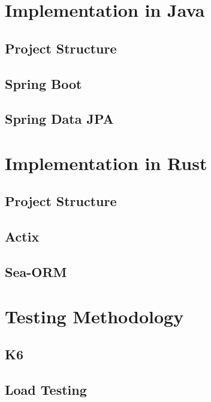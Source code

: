\documentclass[a4paper,12pt]{article}
\begin{document}
	\section{Implementation in Java}
	\label{sec:java_implementation}

	\subsection{Project Structure}
	\label{subsec:project_structure_java}

	\subsection{Spring Boot}
	\label{subsec:spring_boot}

	\subsection{Spring Data JPA}
	\label{subsec:spring_data_jpa}

	\section{Implementation in Rust}
	\label{sec:rust_implementation}
	\subsection{Project Structure}
	\label{subsec:project_structure_rust}

	\subsection{Actix}
	\label{subsec:actix}
	
	\subsection{Sea-ORM}
	\label{subsec:sea_orm}

	\section{Testing Methodology}
	\label{sec:testing_methodology}

	\subsection{K6}
	\label{subsec:k6}

	\subsection{Load Testing}
	\label{subsec:load_testing}
\end{document}
